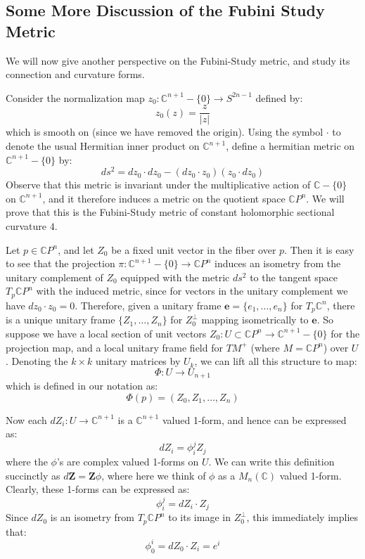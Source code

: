 \documentclass[11pt]{amsart}
\theoremstyle{definition}
\def \CP{ \mathbb{C}P }
\def \C{ \mathbb{C} }
\def \blde{ \mathbf{e} }
\def \bldZ{ \mathbf{Z} }
\begin{document}
\parskip 6pt
\parindent 0pt
\baselineskip 14pt

\subsection{ Some More Discussion of the Fubini Study Metric }

We will now give another perspective on the Fubini-Study metric, and study its connection and curvature forms.

Consider the normalization map $z_0 : \C^{n+1} - \{0\} \rightarrow S^{2n-1}$ defined by:
%
$$ z_0(z) = \frac{z}{|z|} $$
%
which is smooth on (since we have removed the origin).  Using the symbol $\cdot$ to denote the usual Hermitian inner product on $\C^{n+1}$, define a hermitian metric on $\C^{n+1} - \{0\}$ by:
%
$$ds^2 = d z_0 \cdot d z_0 - ( d z_0 \cdot z_0 )( z_0 \cdot d z_0 ) $$
%
Observe that this metric is invariant under the multiplicative action of $\C - \{0\}$ on $\C^{n+1}$, and it therefore induces a metric on the quotient space $\CP^{n}$.  We will prove that this is the Fubini-Study metric of constant holomorphic sectional curvature $4$.

Let $p \in \CP^{n}$, and let $Z_0$ be a fixed unit vector in the fiber over $p$.  Then it is easy to see that the projection $\pi : \C^{n+1} - \{0\} \rightarrow \CP^{n}$ induces an isometry from the unitary complement of $Z_0$ equipped with the metric $ds^2$ to the tangent space $T_p \CP^{n}$ with the induced metric, since for vectors in the unitary complement we have $ d z_0 \cdot z_0 = 0 $.  Therefore, given a unitary frame $\blde = \{ e_1, \ldots, e_n \}$ for $T_p \C^n$, there is a unique unitary frame $ \{ Z_1, \ldots, Z_n \} $ for $Z_0^{\perp}$ mapping isometrically to $\blde$.  So suppose we have a local section of unit vectors $Z_0 : U \subset \CP^{n} \rightarrow  \C^{n+1} - \{0\}$ for the projection map, and a local unitary frame field for $TM^{+}$ (where $M = \CP^{n}$) over $U$.  Denoting the $k \times k$ unitary matrices by $U_k$, we can lift all this structure to map:
%
$$ \Phi : U \rightarrow U_{n+1} $$
% 
which is defined in our notation as:
%
$$ \Phi(p) = (Z_0, Z_1, \ldots, Z_n) $$

Now each $d Z_i : U \rightarrow \C^{n+1}$ is a $\C^{n+1}$ valued 1-form, and hence can be expressed as:
%
$$ d Z_i = \phi^j_i Z_j $$
%
where the $\phi$'s are complex valued 1-forms on $U$.  We can write this definition succinctly as $ d \bldZ = \bldZ \phi$, where here we think of $\phi$ as a $M_{n}( \C )$ valued 1-form.  Clearly, these 1-forms can be expressed as:
%
$$ \phi^j_i = d Z_i \cdot Z_j $$
%
Since $d Z_0$ is an isometry from $T_p \CP^n$ to its image in $Z_0^{\perp}$, this immediately implies that:
%
$$ \phi^i_0 = d Z_0 \cdot Z_i = e^i $$
%
\end{document}
